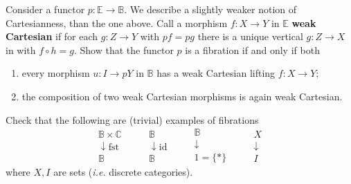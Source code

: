 \documentclass{report}
\newcommand{\bE}[0]{\mathbb E}
\newcommand{\bB}[0]{\mathbb B}
\newcommand{\bC}[0]{\mathbb C}
\newcommand{\fib}[3]{\begin{array}{l}#1 \\[-0.1cm] \downarrow #2 \\ #3\end{array}}
\newcommand{\idd}[0]{\mathrm{id}}
\begin{document}
\begin{exo}
    Consider a functor $p : \bE \to \bB$. We describe a slightly weaker notion of Cartesianness, than
    the one above. Call a morphism $f : X \to Y$ in $\bE$ \textbf{weak Cartesian} if for each
    $g : Z \to Y$ with $pf = pg$  there is a unique vertical $g : Z \to X$ in with $f\circ h = g$.
    Show that the functor $p$ is a fibration if and only if both
    \begin{enumerate}[label=(\alph*)]
        \item every morphism $u : I \to pY$ in $\bB$ has a weak Cartesian lifting $f : X \to Y$;
        \item the composition of two weak Cartesian morphisms is again weak Cartesian.
    \end{enumerate}
\end{exo}

\begin{exo}
    Check that the following are (trivial) examples of fibrations
    $$\fib{\bB\times\bC}{\mathrm{fst}}{\bB}\qquad \fib{\bB}{\idd}{\bB}\qquad \fib{\bB}{}{1 = \{*\}}
    \qquad \fib{X}{}{I}$$
    where $X,I$ are sets (\textit{i.e.} discrete categories).
\end{exo}
\end{document}
